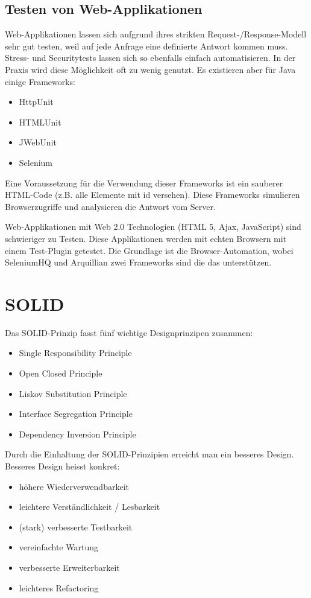 \subsection{Testen von Web-Applikationen}

Web-Applikationen lassen sich aufgrund ihres strikten Request-/Response-Modell sehr gut testen, weil auf jede Anfrage eine definierte Antwort kommen muss. Stress- und Securitytests lassen sich so ebenfalls einfach automatisieren. In der Praxis wird diese Möglichkeit oft zu wenig genutzt. Es existieren aber für Java einige Frameworks:
\begin{itemize}
	\item HttpUnit
	\item HTMLUnit
	\item JWebUnit
	\item Selenium
\end{itemize}
Eine Voraussetzung für die Verwendung dieser Frameworks ist ein sauberer HTML-Code (z.B. alle Elemente mit id versehen). Diese Frameworks simulieren Browserzugriffe und analysieren die Antwort vom Server.
 
Web-Applikationen mit Web 2.0 Technologien (HTML 5, Ajax, JavaScript) sind schwieriger zu Testen. Diese Applikationen werden mit echten Browsern mit einem Test-Plugin getestet. Die Grundlage ist die Browser-Automation, wobei SeleniumHQ und Arquillian zwei Frameworks sind die das unterstützen. 

\section{SOLID}

Das SOLID-Prinzip fasst fünf wichtige Designprinzipen zusammen:
\begin{itemize}
	\item Single Responsibility Principle
	\item Open Closed Principle
	\item Liskov Substitution Principle
	\item Interface Segregation Principle
	\item Dependency Inversion Principle
\end{itemize}
Durch die Einhaltung der SOLID-Prinzipien erreicht man ein besseres Design. Besseres Design heisst konkret:
\begin{itemize}
	\item höhere Wiederverwendbarkeit
	\item leichtere Verständlichkeit / Lesbarkeit
	\item (stark) verbesserte Testbarkeit
	\item vereinfachte Wartung
	\item verbesserte Erweiterbarkeit
	\item leichteres Refactoring
\end{itemize}

